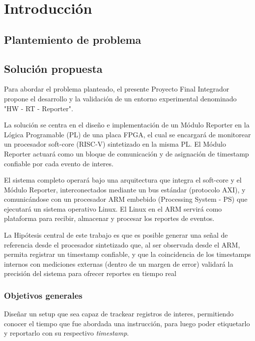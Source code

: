\chapter{Introducción}

\section{Plantemiento de problema}
\label{S:planteamiento de problema}

\section{Solución propuesta}

Para abordar el problema planteado, el presente Proyecto Final Integrador propone el desarrollo y la validación de un entorno experimental denominado "HW - RT - Reporter".

La solución se centra en el diseño e implementación de un Módulo Reporter en la Lógica Programable (PL) de una placa FPGA, el cual se encargará de monitorear un procesador soft-core (RISC-V) sintetizado en la misma PL. El Módulo Reporter actuará como un bloque de comunicación y de asignación de timestamp confiable por cada evento de interes.

El sistema completo operará bajo una arquitectura que integra el soft-core y el Módulo Reporter, interconectados mediante un bus estándar (protocolo AXI), y comunicándose con un procesador ARM embebido (Processing System - PS) que ejecutará un sistema operativo Linux. El Linux en el ARM servirá como plataforma para recibir, almacenar y procesar los reportes de eventos.

La Hipótesis central de este trabajo es que es posible generar una señal de referencia desde el procesador sintetizado que, al ser observada desde el ARM, permita registrar un timestamp confiable, y que la coincidencia de los timestamps internos con mediciones externas (dentro de un margen de error) validará la precisión del sistema para ofrecer reportes en tiempo real


\subsection*{Objetivos generales}
\label{S:doble-faz}

Diseñar un setup que sea capaz de trackear registros de interes, permitiendo conocer el tiempo que fue abordada una instrucción, para luego poder etiquetarlo y reportarlo con su respectivo \textit{timestamp}.

